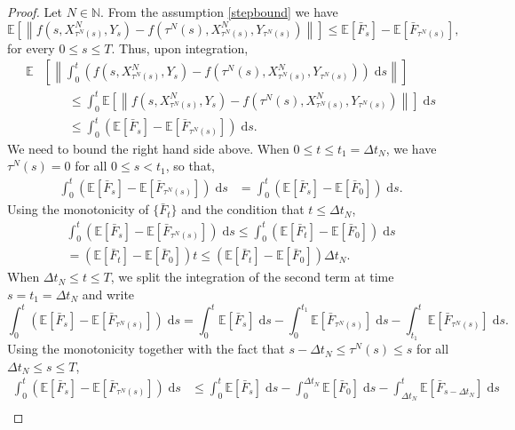 \documentclass[reqno,12pt]{amsart}
\theoremstyle{plain} %
\theoremstyle{definition} %
\begin{document}
\begin{proof}
    Let $N\in \mathbb{N}$. From the assumption \eqref{stepbound} we have
    \[
        \mathbb{E}\left[\left\|f(s, X_{\tau^N(s)}^N, Y_s) - f(\tau^N(s), X_{\tau^N(s)}^N, Y_{\tau^N(s)})\right\|\right] \leq \mathbb{E}[\bar F_s] - \mathbb{E}[\bar F_{\tau^N(s)}],
    \]
    for every $0\leq s \leq T$. Thus, upon integration,
    \begin{align*}
        \mathbb{E}&\left[\left\|\int_0^t \left( f(s, X_{\tau^N(s)}^N, Y_s) - f(\tau^N(s), X_{\tau^N(s)}^N, Y_{\tau^N(s)}) \right)\;\mathrm{d}s\right\|\right] \\
        & \qquad \leq \int_0^t \mathbb{E}\left[\left\|f(s, X_{\tau^N(s)}^N, Y_s) - f(\tau^N(s), X_{\tau^N(s)}^N, Y_{\tau^N(s)})\right\| \right]\;\mathrm{d}s \\
        & \qquad \leq \int_0^t \left(\mathbb{E}[\bar F_s] - \mathbb{E}[\bar F_{\tau^N(s)}]\right)\;\mathrm{d}s.
    \end{align*}
    We need to bound the right hand side above. When $0 \leq t\leq t_1 = \Delta t_N$, we have $\tau^N(s) = 0$ for all $0 \leq s < t_1$, so that,
    \begin{align*}
      \int_0^t (\mathbb{E}[\bar F_s] - \mathbb{E}[\bar F_{\tau^N(s)}])\;\mathrm{d}s & = \int_0^t (\mathbb{E}[\bar F_s] - \mathbb{E}[\bar F_{0}]) \;\mathrm{d}s.
    \end{align*}
    Using the monotonicity of $\{\bar F_t\}$ and the condition that $t \leq \Delta t_N$,
    \begin{multline*}
      \int_0^t (\mathbb{E}[\bar F_s] - \mathbb{E}[\bar F_{\tau^N(s)}])\;\mathrm{d}s \leq \int_0^t (\mathbb{E}[\bar F_t] - \mathbb{E}[\bar F_0]) \;\mathrm{d}s  \\
      = (\mathbb{E}[\bar F_t] - \mathbb{E}[\bar F_0])t \leq (\mathbb{E}[\bar F_t] - \mathbb{E}[\bar F_0])\Delta t_N.
    \end{multline*}
    When $\Delta t_N\leq t \leq T$, we split the integration of the second term at time $s = t_1 = \Delta t_N$ and write
    \[ 
      \int_0^t (\mathbb{E}[\bar F_s] - \mathbb{E}[\bar F_{\tau^N(s)}])\;\mathrm{d}s = \int_0^t \mathbb{E}[\bar F_s] \;\mathrm{d}s - \int_0^{t_1} \mathbb{E}[\bar F_{\tau^N(s)}]\;\mathrm{d}s - \int_{t_1}^t \mathbb{E}[\bar F_{\tau^N(s)}]\;\mathrm{d}s.
    \]
    Using the monotonicity together with the fact that $s - \Delta t_N\leq \tau^N(s) \leq s$ for all $\Delta t_N\leq s \leq T$,
    \begin{align*}
        \int_0^t (\mathbb{E}[\bar F_s] - \mathbb{E}[\bar F_{\tau^N(s)}])\;\mathrm{d}s & \leq \int_0^t \mathbb{E}[\bar F_s] \;\mathrm{d}s - \int_0^{\Delta t_N} \mathbb{E}[\bar F_0]\;\mathrm{d}s - \int_{\Delta t_N}^t \mathbb{E}[\bar F_{s-\Delta t_N}]\;\mathrm{d}s \\

\end{align*}
\end{proof}
\end{document}
